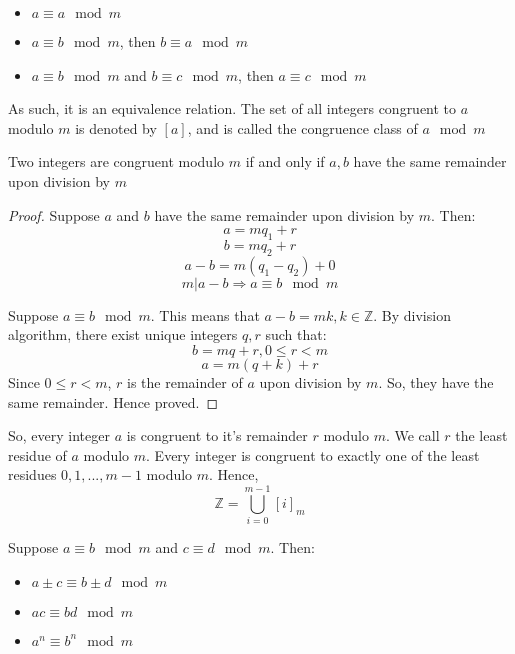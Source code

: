 \documentclass[12pt,letterpaper]{amsbook}
\theoremstyle{definition}
\newcommand{\Z}{\mathbb{Z}}
\begin{document}
\begin{itemize}
  \item $a \equiv a \mod m$
  \item $a \equiv b \mod m$, then $b \equiv a \mod m$
  \item $a \equiv b \mod m$ and $b \equiv c \mod m$, then $a \equiv c \mod m$
\end{itemize}

As such, it is an equivalence relation. The set of all integers congruent to $a$ modulo $m$ is denoted by $[a]$, and is called the congruence class of $a \mod m$

\begin{lemma}
  Two integers are congruent modulo $m$ if and only if $a,b$ have the same remainder upon division by $m$ 
\end{lemma}
\begin{proof}
Suppose $a$ and $b$ have the same remainder upon division by $m$. Then:
\[a = mq_1 + r\]
\[b = mq_2 + r\]
\[a-b = m(q_1-q_2) + 0\]
\[m|a-b \Rightarrow a \equiv b \mod m\]

Suppose $a \equiv b \mod m$. This means that $a-b = mk, k \in \Z$. By division algorithm, there exist unique integers $q,r$ such that:
\[b = mq+r, 0 \leq r < m\]
\[a = m(q+k) + r\]
Since $0 \leq r < m$, $r$ is the remainder of $a$ upon division by $m$. So, they have the same remainder. Hence proved.
\end{proof}

So, every integer $a$ is congruent to it's remainder $r$ modulo $m$. We call $r$ the least residue of $a$ modulo $m$. Every integer is congruent to exactly one of the least residues $0,1,...,m-1$ modulo $m$. Hence,
\[\Z = \bigcup_{i=0}^{m-1} [i]_m\]

\begin{lemma}
  Suppose $a \equiv b \mod m$ and $c \equiv d \mod m$. Then:
  \begin{itemize}
    \item $a \pm c \equiv b \pm d \mod m$
    \item $ac \equiv bd \mod m$
    \item $a^n \equiv b^n \mod m$
  \end{itemize}
\end{lemma}
\end{document}
